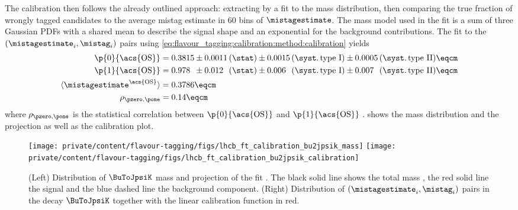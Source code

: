 The calibration then follows the already outlined approach: extracting \sweights
by a fit to the \Bu mass distribution, then comparing the true fraction of
wrongly tagged candidates to the average mistag estimate in $\num{60}$ bins of
$\mistagestimate$. The mass model used in the fit is a sum of three Gaussian
\acp{PDF} with a shared mean to describe the signal shape and an exponential
\PDF for the background contributions. The fit to the
$(\mistagestimate_i,\mistag_i)$ pairs using
\cref{eq:flavour_tagging:calibration:method:calibration} yields
%
\begin{equation*}\label{eq:flavour_tagging:calibration:os:parameters}
  \begin{split}
    \p{0}{\text{\acs{OS}}} &= 0.3815 \pm 0.0011 \text{\,(\stat)} 
                               \pm 0.0015 \text{\,(\syst.\,type I)}  
                               \pm 0.0005 \text{\,(\syst.\,type II)} \eqcm\\ %
    \p{1}{\text{\acs{OS}}} &= 0.978\phantom{0} \pm 0.012\phantom{0} \text{\,(\stat)} 
                                         \pm 0.006\phantom{0}  \text{\,(\syst.\,type I)} 
                                         \pm 0.007\phantom{0}  \text{\,(\syst.\,type II)} \eqcm\\ %
    \langle\mistagestimate^{\text{\acs{OS}}}\rangle &= 0.3786 \eqcm \\
    \rho_{\pzero,\pone} &= 0.14 \eqcm
  \end{split}
\end{equation*}
%
where $\rho_{\pzero,\pone}$ is the statistical correlation between
$\p{0}{\text{\acs{OS}}}$ and $\p{1}{\text{\acs{OS}}}$ \cite{Aaij:2015vza}.
 shows the mass
distribution and the \PDF projection as well as the calibration plot.
%
\begin{figure}
  \centering
  \texttt{[image: private/content/flavour-tagging/figs/lhcb\_ft\_calibration\_bu2jpsik\_mass]}
  \texttt{[image: private/content/flavour-tagging/figs/lhcb\_ft\_calibration\_bu2jpsik\_calibration]}
  \caption{(Left) Distribution of $\BuToJpsiK$ mass and projection of the fit \PDF.
  The black solid line shows the total mass \PDF, the red solid line the signal
  and the blue dashed line the background component. (Right) Distribution of
  $(\mistagestimate_i,\mistag_i)$ pairs in the decay $\BuToJpsiK$ together with
  the linear calibration function in red. \cite{Aaij:2015vza}}
  \label{fig:flavour_tagging:calibration:os:mass_and_calibration}
\end{figure}
